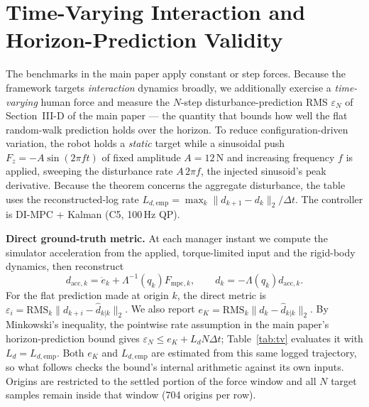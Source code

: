 \documentclass[journal]{IEEEtran}
\newcommand{\Fmpck}[1]{F_{\text{mpc},#1}}
\newcommand{\dhat}{\hat{d}}
\begin{document}
\section{Time-Varying Interaction and Horizon-Prediction Validity}\label{sec:tv}

The benchmarks in the main paper apply constant or step forces. Because
the framework targets \emph{interaction} dynamics broadly, we
additionally exercise a \emph{time-varying} human force and measure the
$N$-step disturbance-prediction RMS $\varepsilon_N$ of
Section~III-D of the main paper --- the quantity that bounds how well the
flat random-walk prediction holds over the horizon. To reduce
configuration-driven variation, the robot
holds a \emph{static} target while a sinusoidal push
$F_z=-A\sin(2\pi ft)$ of fixed amplitude $A=12$\,N and increasing
frequency $f$ is applied, sweeping the disturbance rate
$A\,2\pi f$, the injected sinusoid's peak derivative. Because the theorem
concerns the aggregate disturbance, the table uses the reconstructed-log rate
$L_{d,\mathrm{emp}}=\max_k\|d_{k+1}-d_k\|_2/\Delta t$.
The controller is DI-MPC + Kalman (C5, 100\,Hz
QP).

\textbf{Direct ground-truth metric.} At each manager instant we compute
the simulator acceleration from the applied, torque-limited input and the
rigid-body dynamics, then reconstruct
\begin{equation*}
d_{\mathrm{acc},k}=\ddot e_k+\Lambda^{-1}(q_k)\Fmpck{k},\qquad
d_k=-\Lambda(q_k)d_{\mathrm{acc},k}.
\end{equation*}
For the flat prediction made at origin $k$, the direct metric is
$\varepsilon_i=\mathrm{RMS}_k\|d_{k+i}-\dhat_{k|k}\|_2$. We also report
$e_K=\mathrm{RMS}_k\|d_k-\dhat_{k|k}\|_2$. By Minkowski's inequality,
the pointwise rate assumption in the main paper's horizon-prediction bound
gives $\varepsilon_N\le e_K+L_dN\Delta t$; Table~\ref{tab:tv} evaluates it
with $L_d=L_{d,\mathrm{emp}}$. Both $e_K$ and $L_{d,\mathrm{emp}}$ are
estimated from this same logged trajectory, so what follows checks the
bound's internal arithmetic against its own inputs. Origins are restricted
to the settled portion of the force window and all $N$ target samples
remain inside that window (704 origins per row).
\end{document}
